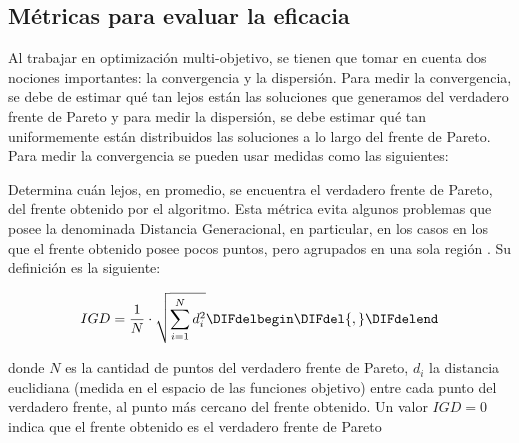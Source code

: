       \subsection{M\'etricas para evaluar la eficacia}
\addtocounter{subsection}{-1}%
\DIFdelend Al trabajar en optimizaci\'on multi-objetivo, se tienen que tomar en cuenta dos nociones importantes: la convergencia y la 
      dispersi\'on. Para medir la convergencia, se debe de estimar qu\'e tan lejos est\'an las soluciones que generamos del
      verdadero frente de Pareto y para medir la dispersi\'on, se debe estimar qu\'e tan uniformemente est\'an distribuidos 
      las soluciones a lo largo del frente de Pareto. Para medir la convergencia se pueden usar medidas como las siguientes:

      \begin{definicion} 
      Determina cu\'an lejos, en promedio, se encuentra el verdadero frente de Pareto, del frente obtenido por el algoritmo.
      Esta m\'etrica evita algunos problemas que posee la denominada Distancia Generacional, en particular, en los casos en 
      los que el frente obtenido posee pocos puntos, pero agrupados en una sola regi\'on \cite{Veldhuizen98}. 
      Su definici\'on es la siguiente:

      \[
	IGD = \frac{1}{N} \cdot \sqrt{\sum^{N}_{i=1}{d^2_i}}
      \DIFdelbegin \DIFdel{,
      }\DIFdelend \]
      \DIFdelbegin %
\DIFdelend \DIFaddbegin 

      \DIFaddend donde $N$ es la cantidad de puntos del verdadero frente de Pareto, $d_i$ la distancia euclidiana (medida en el espacio 
      de las funciones objetivo) entre cada punto del verdadero frente, al punto m\'as cercano del frente obtenido. Un valor 
      $IGD = 0$ indica que el frente obtenido es el verdadero frente de Pareto\DIFdelbegin {}%
\DIFdelend \DIFaddbegin {}

      \DIFaddend \end{definicion}

